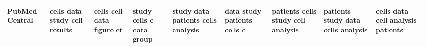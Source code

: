 \documentclass[11pt,a4paper]{article}
\begin{document}
\begin{appendices}
\begin{table*}[htp]
\begin{tiny}
\begin{tabular}{|p{}|p{}|p{}|p{}|p{}|p{}|p{}|p{}|p{}|}
PubMed Central & cells \newline data \newline study \newline cell \newline results & cells \newline cell \newline data \newline figure \newline et & study \newline cells \newline c \newline data \newline group & study \newline data \newline patients \newline cells \newline analysis & data \newline study \newline patients \newline cells \newline c & patients \newline cells \newline study \newline cell \newline analysis & patients \newline study \newline data \newline cells \newline analysis & cells \newline data \newline cell \newline analysis \newline patients\\\hline

\end{tabular}
\end{tiny}
\end{table*}
\end{appendices}
\end{document}
